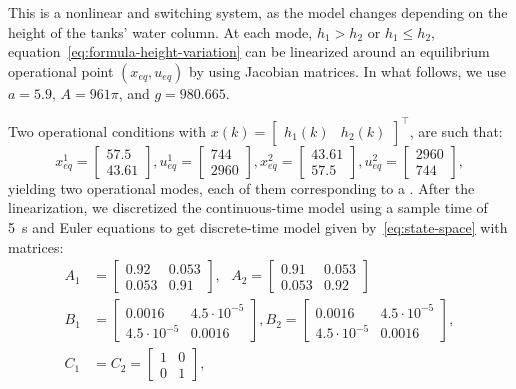 This is a nonlinear and switching system, as the model changes depending on the
height of the tanks' water column. At each mode, \(h_1>h_2\) or \(h_1\leq h_2\),
equation~\eqref{eq:formula-height-variation} can be linearized around an
equilibrium operational point \((x_{eq},u_{eq})\) by using Jacobian matrices. In
what follows, we use \(a=5.9\), \(A=961\pi{}\), and \(g=980.665\).

Two operational conditions with
\(x(k) = \begin{bmatrix}h_1(k) & h_2(k)\end{bmatrix}^\top{}\), are such that:
%
\begin{equation*}
  x_{eq}^1 =\! \begin{bmatrix}
    57.5 \\ 43.61
  \end{bmatrix}\!,
  u_{eq}^1 =\! \begin{bmatrix}
    744 \\ 2960
  \end{bmatrix}\!,
  x_{eq}^2 = \begin{bmatrix}
    43.61 \\ 57.5
  \end{bmatrix}\!,
  u_{eq}^2 =\! \begin{bmatrix}
    2960 \\ 744
  \end{bmatrix}\!,
\end{equation*}
yielding two operational modes, each of them corresponding to a \CG{}.\@
%
After the linearization, we discretized the continuous-time model using a sample
time of \SI{5}{\second} and Euler equations to get discrete-time model given
by~\eqref{eq:state-space} with matrices:
%
\begin{align*}
  A_1 & =
  \begin{bmatrix}
    0.92  & 0.053 \\
    0.053 & 0.91
  \end{bmatrix}, ~~~ A_2 = \begin{bmatrix}
    0.91  & 0.053 \\
    0.053 & 0.92
  \end{bmatrix} \\
  B_1 & =
  \begin{bmatrix}
    0.0016          & 4.5\cdot10^{-5} \\
    4.5\cdot10^{-5} & 0.0016
  \end{bmatrix},
  B_2 = \begin{bmatrix}
    0.0016          & 4.5\cdot10^{-5} \\
    4.5\cdot10^{-5} & 0.0016
  \end{bmatrix},                              \\
  C_1 & = C_2 =
  \begin{bmatrix}
    1 & 0 \\
    0 & 1
  \end{bmatrix},
\end{align*}
